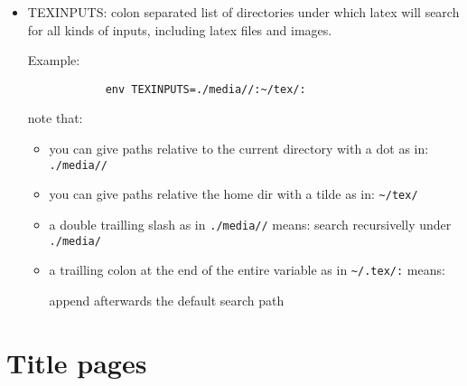 \documentclass[12pt]{article}
\begin{document}
\begin{itemize}
    \item TEXINPUTS: colon separated list of directories under which latex will search for all kinds of inputs,
        including latex files and images.

        Example:

        \begin{lstlisting}
            env TEXINPUTS=./media//:~/tex/:
        \end{lstlisting}

        note that:

        \begin{itemize}

            \item you can give paths relative to the current directory with a dot as in: \lstinline|./media//|

            \item you can give paths relative the home dir with a tilde as in: \lstinline|~/tex/|

            \item a double trailling slash as in \lstinline|./media//| means: search recursivelly under \lstinline|./media/|

            \item a trailling colon at the end of the entire variable as in \lstinline|~/.tex/:| means:

                append afterwards the default search path
        \end{itemize}
\end{itemize}

\section{Title pages} \label{title-pages}

    \maketitle
    \newpage
\end{document}
